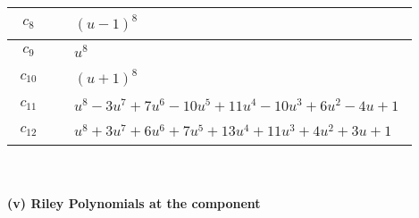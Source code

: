 \documentclass[1p]{elsarticle_modified}
\theoremstyle{definition}
\begin{document}
\begin{tabular}{m{50pt}|m{274pt}}
\hline $$\begin{aligned}c_{8}\end{aligned}$$&$\begin{aligned}
&(u-1)^8
\end{aligned}$\\
\hline $$\begin{aligned}c_{9}\end{aligned}$$&$\begin{aligned}
&u^8
\end{aligned}$\\
\hline $$\begin{aligned}c_{10}\end{aligned}$$&$\begin{aligned}
&(u+1)^8
\end{aligned}$\\
\hline $$\begin{aligned}c_{11}\end{aligned}$$&$\begin{aligned}
&u^8-3 u^7+7 u^6-10 u^5+11 u^4-10 u^3+6 u^2-4 u+1
\end{aligned}$\\
\hline $$\begin{aligned}c_{12}\end{aligned}$$&$\begin{aligned}
&u^8+3 u^7+6 u^6+7 u^5+13 u^4+11 u^3+4 u^2+3 u+1
\end{aligned}$\\
\hline
\end{tabular}\\~\\
\newpage\renewcommand{\arraystretch}{1}
\flushleft \textbf{(v) Riley Polynomials at the component}\newline \\
\end{document}
